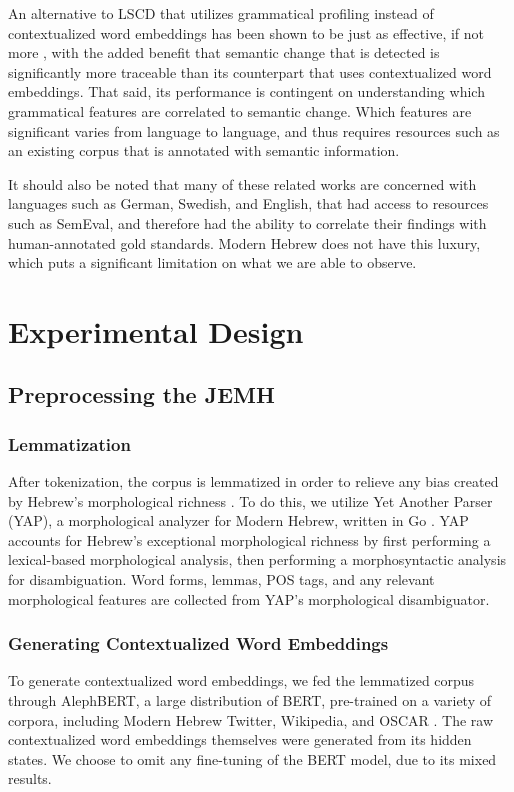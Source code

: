 \documentclass[10pt, a4paper]{article}
\begin{document}
An alternative to LSCD that utilizes grammatical profiling instead of contextualized word embeddings has been shown to be just as effective, if not more \cite{grammaticalprofiling}, with the added benefit that semantic change that is detected is significantly more traceable than its counterpart that uses contextualized word embeddings. That said, its performance is contingent on understanding which grammatical features are correlated to semantic change. Which features are significant varies from language to language, and thus requires resources such as an existing corpus that is annotated with semantic information.

It should also be noted that many of these related works are concerned with languages such as German, Swedish, and English, that had access to resources such as SemEval, and therefore had the ability to correlate their findings with human-annotated gold standards. Modern Hebrew does not have this luxury, which puts a significant limitation on what we are able to observe.
\section{Experimental Design}

\subsection{Preprocessing the JEMH}

\subsubsection{Lemmatization}
After tokenization, the corpus is lemmatized in order to relieve any bias created by Hebrew's morphological richness \cite{Laicher2021}. To do this, we utilize Yet Another Parser (YAP), a morphological analyzer for Modern Hebrew, written in Go \cite{yap}. YAP accounts for Hebrew's exceptional morphological richness by first performing a lexical-based morphological analysis, then performing a morphosyntactic analysis for disambiguation. Word forms, lemmas, POS tags, and any relevant morphological features are collected from YAP's morphological disambiguator. 

\subsubsection{Generating Contextualized Word Embeddings}
To generate contextualized word embeddings, we fed the lemmatized corpus through AlephBERT, a large distribution of BERT, pre-trained on a variety of corpora, including Modern Hebrew Twitter, Wikipedia, and OSCAR \cite{alephBERT}. The raw contextualized word embeddings themselves were generated from its hidden states. We choose to omit any fine-tuning of the BERT model, due to its mixed results.
\end{document}
